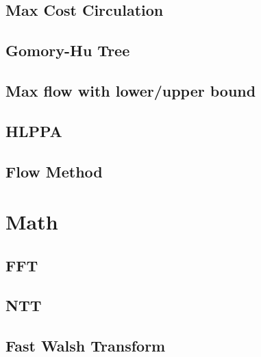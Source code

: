 \documentclass[a4paper,10pt,twocolumn,oneside]{article}
\begin{document}
\subsection{Max Cost Circulation}


%

\subsection{Gomory-Hu Tree}


\subsection{Max flow with lower/upper bound}


%

\subsection{HLPPA}


\subsection{Flow Method}


\section{Math}
\subsection{FFT}


\subsection{NTT}


\subsection{Fast Walsh Transform}

\end{document}

